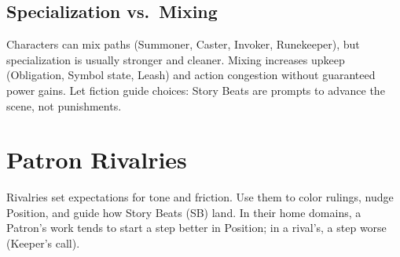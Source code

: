 \subsection{Specialization vs.\ Mixing}
\label{subsec:mixing}
Characters can mix paths (Summoner, Caster, Invoker, Runekeeper), but specialization is usually stronger and cleaner. Mixing increases upkeep (Obligation, Symbol state, Leash) and action congestion without guaranteed power gains. Let fiction guide choices: Story Beats are prompts to advance the scene, not punishments.
















\section{Patron Rivalries}
\label{sec:patron-rivalries}

Rivalries set expectations for tone and friction. Use them to color rulings, nudge Position, and guide how Story Beats (SB) land. In their home domains, a Patron’s work tends to start a step better in Position; in a rival’s, a step worse (Keeper’s call).

